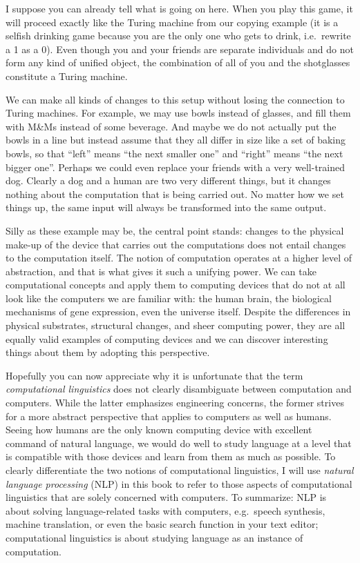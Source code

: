 I suppose you can already tell what is going on here.
When you play this game, it will proceed exactly like the Turing machine from our copying example (it is a selfish drinking game because you are the only one who gets to drink, i.e.~rewrite a 1 as a 0).
Even though you and your friends are separate individuals and do not form any kind of unified object, the combination of all of you and the shotglasses constitute a Turing machine.

We can make all kinds of changes to this setup without losing the connection to Turing machines.
For example, we may use bowls instead of glasses, and fill them with M\&Ms instead of some beverage.
And maybe we do not actually put the bowls in a line but instead assume that they all differ in size like a set of baking bowls, so that ``left'' means ``the next smaller one'' and ``right'' means ``the next bigger one''.
Perhaps we could even replace your friends with a very well-trained dog.
Clearly a dog and a human are two very different things, but it changes nothing about the computation that is being carried out.
No matter how we set things up, the same input will always be transformed into the same output.

Silly as these example may be, the central point stands: changes to the physical make-up of the device that carries out the computations does not entail changes to the computation itself.
The notion of computation operates at a higher level of abstraction, and that is what gives it such a unifying power.
We can take computational concepts and apply them to computing devices that do not at all look like the computers we are familiar with: the human brain, the biological mechanisms of gene expression, even the universe itself.
Despite the differences in physical substrates, structural changes, and sheer computing power, they are all equally valid examples of computing devices and we can  discover interesting things about them by adopting this perspective.

Hopefully you can now appreciate why it is unfortunate that the term \emph{computational linguistics} does not clearly disambiguate between computation and computers.
While the latter emphasizes engineering concerns, the former strives for a more abstract perspective that applies to computers as well as humans.
Seeing how humans are the only known computing device with excellent command of natural language, we would do well to study language at a level that is compatible with those devices and learn from them as much as possible.
To clearly differentiate the two notions of computational linguistics, I will use \emph{natural language processing} (NLP) in this book to refer to those aspects of computational linguistics that are solely concerned with computers.
To summarize: NLP is about solving language-related tasks with computers, e.g.~speech synthesis, machine translation, or even the basic search function in your text editor;
computational linguistics is about studying language as an instance of computation.

